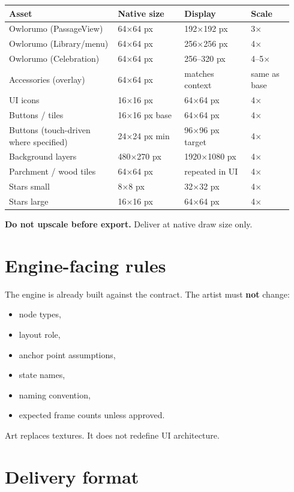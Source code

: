 \documentclass[11pt,a4paper]{article}
\begin{document}
\begin{longtable}{@{}p{0.36\linewidth}p{0.22\linewidth}p{0.22\linewidth}p{0.14\linewidth}@{}}
\toprule
\textbf{Asset} & \textbf{Native size} & \textbf{Display} & \textbf{Scale} \\
\midrule
Owlorumo (PassageView) & 64×64 px & 192×192 px & 3× \\
Owlorumo (Library/menu) & 64×64 px & 256×256 px & 4× \\
Owlorumo (Celebration) & 64×64 px & 256–320 px & 4–5× \\
Accessories (overlay) & 64×64 px & matches context & same as base \\
UI icons & 16×16 px & 64×64 px & 4× \\
Buttons / tiles & 16×16 px base & 64×64 px & 4× \\
Buttons (touch-driven where specified) & 24×24 px min & 96×96 px target & 4× \\
Background layers & 480×270 px & 1920×1080 px & 4× \\
Parchment / wood tiles & 64×64 px & repeated in UI & 4× \\
Stars small & 8×8 px & 32×32 px & 4× \\
Stars large & 16×16 px & 64×64 px & 4× \\
\bottomrule
\end{longtable}

\textbf{Do not upscale before export.} Deliver at native draw size only.

\section{Engine-facing rules}

The engine is already built against the contract. The artist must \textbf{not} change:
\begin{itemize}
  \item node types,
  \item layout role,
  \item anchor point assumptions,
  \item state names,
  \item naming convention,
  \item expected frame counts unless approved.
\end{itemize}

Art replaces textures. It does not redefine UI architecture.

\section{Delivery format}
\end{document}
